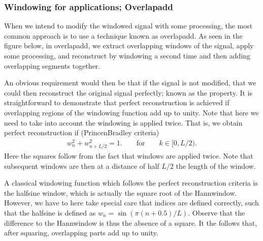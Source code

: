 \documentclass[letterpaper,10pt,english]{jupyterBook}
\begin{document}
\subsubsection{Windowing for  applications; Overlap\sphinxhyphen{}add}
\label{\detokenize{Representations/Windowing:windowing-for-processing-applications-overlap-add}}
\sphinxAtStartPar
When we intend to modify the windowed signal with some processing, the
most common approach is to use a technique known as overlap\sphinxhyphen{}add. As seen
in the figure below, in overlap\sphinxhyphen{}add, we extract overlapping
windows of the signal, apply some processing, and reconstruct by
windowing a second time and then adding overlapping segments together.

\sphinxAtStartPar
An obvious requirement would then be that if the signal is not modified,
that we could then reconstruct the original signal perfectly; known as
the  property. It is straightforward to
demonstrate that perfect reconstruction is achieved if overlapping
regions of the windowing function add up to unity. Note that here we
need to take into account the windowing is applied twice. That is, we
obtain perfect reconstruction if (Princen\sphinxhyphen{}Bradley criteria)
\begin{equation*}
\begin{split} w_n^2 + w_{n+L/2}^2 = 1.\qquad\text{for}\qquad k\in[0,L/2).
\end{split}
\end{equation*}
\sphinxAtStartPar
Here the squares follow from the fact that windows are applied twice.
Note that subsequent windows are then at a distance of half \(L/2\) the
length of the window.

\sphinxAtStartPar
A classical windowing function which follows the perfect reconstruction
criteria is the half\sphinxhyphen{}sine window, which is actually the square root of
the Hann\sphinxhyphen{}window. However, we have to here take special care that indices
are defined correctly, such that the half\sphinxhyphen{}sine is defined as \(
w_n=\sin\left(\pi (n+0.5)/L\right). \) Observe that the difference
to the Hann\sphinxhyphen{}window is thus the absence of a square. It the follows that,
after squaring, overlapping parts add up to unity.
\end{document}
